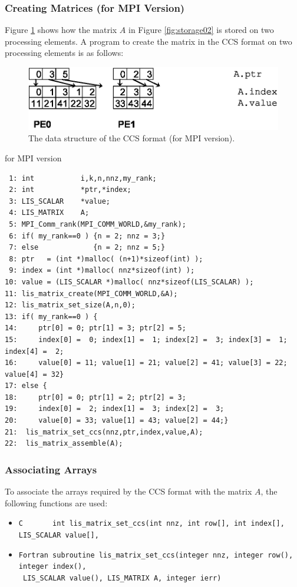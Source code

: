 \documentclass[a4paper]{article}
\begin{document}
\subsubsection{Creating Matrices (for MPI Version)}
Figure \ref{fig:storage02_mpi} shows how the matrix $A$ in Figure
\ref{fig:storage02} is stored on two processing elements. A program to create the
matrix in the CCS format on two processing elements is as follows:
\begin{figure}[h]
{\centering 
\includegraphics{storage02_mpi.eps} 
\caption{The data structure of the CCS format (for MPI version).}\label{fig:storage02_mpi}}
\end{figure}
\begin{itembox}[l]{for MPI version}
\small
\begin{verbatim}
 1: int           i,k,n,nnz,my_rank;
 2: int           *ptr,*index;
 3: LIS_SCALAR    *value;
 4: LIS_MATRIX    A;
 5: MPI_Comm_rank(MPI_COMM_WORLD,&my_rank);
 6: if( my_rank==0 ) {n = 2; nnz = 3;}
 7: else             {n = 2; nnz = 5;}
 8: ptr   = (int *)malloc( (n+1)*sizeof(int) );
 9: index = (int *)malloc( nnz*sizeof(int) );
10: value = (LIS_SCALAR *)malloc( nnz*sizeof(LIS_SCALAR) );
11: lis_matrix_create(MPI_COMM_WORLD,&A);
12: lis_matrix_set_size(A,n,0);
13: if( my_rank==0 ) {
14:     ptr[0] = 0; ptr[1] = 3; ptr[2] = 5;
15:     index[0] =  0; index[1] =  1; index[2] =  3; index[3] =  1; index[4] =  2;
16:     value[0] = 11; value[1] = 21; value[2] = 41; value[3] = 22; value[4] = 32}
17: else {
18:     ptr[0] = 0; ptr[1] = 2; ptr[2] = 3;
19:     index[0] =  2; index[1] =  3; index[2] =  3;
20:     value[0] = 33; value[1] = 43; value[2] = 44;}
21:  lis_matrix_set_ccs(nnz,ptr,index,value,A);
22:  lis_matrix_assemble(A);
\end{verbatim}
\end{itembox}
\subsubsection{Associating Arrays}
To associate the arrays required by the CCS format with the matrix $A$, the following functions are used:
\begin{itemize}
\item \verb|C       int lis_matrix_set_ccs(int nnz, int row[], int index[], LIS_SCALAR value[],|\\
\item \verb|Fortran subroutine lis_matrix_set_ccs(integer nnz, integer row(), integer index(),|\\
      \verb| LIS_SCALAR value(), LIS_MATRIX A, integer ierr)|
\end{itemize}
\end{document}
